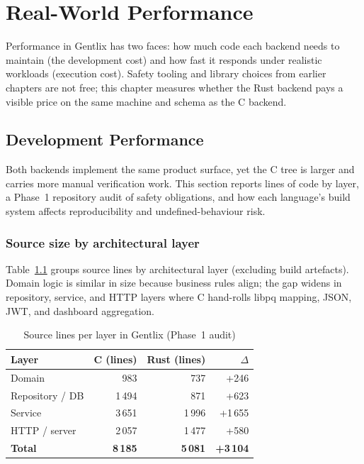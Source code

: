 \chapter{Real-World Performance}
\label{chap:ch8}

\par Performance in Gentlix has two faces: how much code each backend needs to maintain 
(the development cost) and how fast it responds under realistic workloads (execution 
cost). Safety tooling and library choices from earlier chapters are not free; this chapter 
measures whether the Rust backend pays a visible price on the same machine and schema 
as the C backend.

\section{Development Performance}
\label{sec:ch8sec1}

\par Both backends implement the same product surface, yet the C tree is larger and carries 
more manual verification work. This section reports lines of code by layer, a Phase~1 
repository audit of safety obligations, and how each language's build system affects 
reproducibility and undefined-behaviour risk.

\subsection{Source size by architectural layer}
\label{subsec:ch8sec1loc}

\par Table~\ref{tab:loc_by_layer} groups source lines by architectural layer (excluding 
build artefacts). Domain logic is similar in size because business rules align; the gap 
widens in repository, service, and HTTP layers where C hand-rolls libpq mapping, JSON, 
JWT, and dashboard aggregation.

\begin{table}[htbp]
\centering
\begin{tabular}{|l|r|r|r|}
\hline
\textbf{Layer} & \textbf{C (lines)} & \textbf{Rust (lines)} & \textbf{$\Delta$} \\
\hline
Domain & 983 & 737 & +246 \\
Repository / DB & 1\,494 & 871 & +623 \\
Service & 3\,651 & 1\,996 & +1\,655 \\
HTTP / server & 2\,057 & 1\,477 & +580 \\
\hline
\textbf{Total} & \textbf{8\,185} & \textbf{5\,081} & \textbf{+3\,104} \\
\hline
\end{tabular}
\caption{Source lines per layer in Gentlix (Phase~1 audit)}
\label{tab:loc_by_layer}
\end{table}

